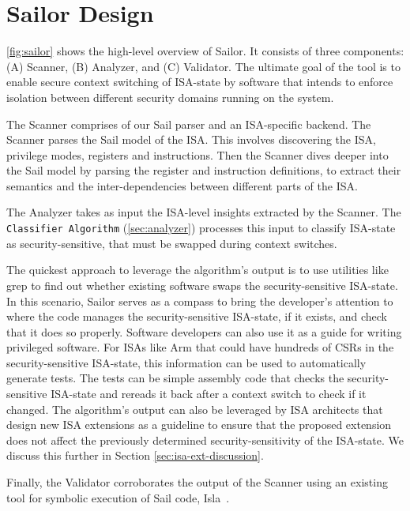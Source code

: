 \section{Sailor Design}
\label{sec:sailor} 



\autoref{fig:sailor} shows the high-level overview of Sailor. It consists of three components: (A) Scanner, (B) Analyzer, and (C) Validator. The ultimate goal of the tool is to enable secure context switching of ISA-state by software that intends to enforce isolation between different security domains running on the system. 

The Scanner comprises of our Sail parser and an ISA-specific backend. 
The Scanner parses the Sail model of the ISA. 
This involves discovering the ISA, \ie{} privilege modes, registers and instructions. 
Then the Scanner dives deeper into the Sail model by parsing the register and instruction definitions, to extract their semantics and the inter-dependencies between different parts of the ISA.

The Analyzer takes as input the ISA-level insights extracted by the Scanner. 
The \texttt{Classifier Algorithm} (\autoref{sec:analyzer}) processes this input to classify ISA-state as security-sensitive, that must be swapped during context switches.

The quickest approach to leverage the algorithm's output is to use utilities like grep to find out whether existing software swaps the security-sensitive ISA-state. 
In this scenario, Sailor serves as a compass to bring the developer's attention to where the code manages the security-sensitive ISA-state, if it exists, and check that it does so properly.
Software developers can also use it as a guide for writing privileged software. 
For ISAs like Arm that could have hundreds of CSRs in the security-sensitive ISA-state, this information can be used to automatically generate tests. 
The tests can be simple assembly code that checks the security-sensitive ISA-state and rereads it back after a context switch to check if it changed. 
The algorithm's output can also be leveraged by ISA architects that design new ISA extensions as a guideline to ensure that the proposed extension does not affect the previously determined security-sensitivity of the ISA-state. We discuss this further in Section \ref{sec:isa-ext-discussion}.

Finally, the Validator corroborates the output of the Scanner using an existing tool for symbolic execution of Sail code, Isla~\cite{isla}.




